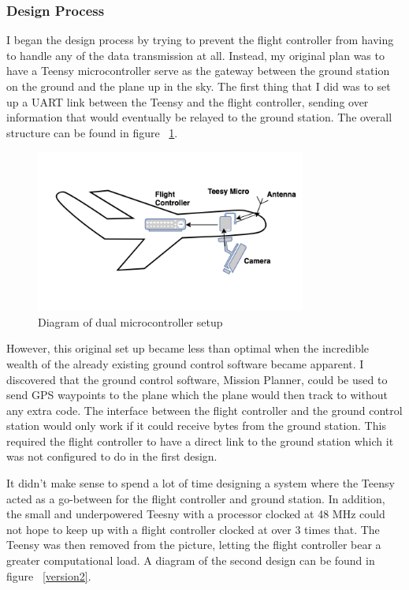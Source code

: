 \documentclass[12pt,journal,compsoc]{IEEEtran}
\begin{document}
\subsubsection{Design Process}
I began the design process by trying to prevent the flight controller from having to handle any of the data transmission at all. Instead, my original plan was to have a Teensy microcontroller serve as the gateway between the ground station on the ground and the plane up in the sky. The first thing that I did was to set up a UART link between the Teensy and the flight controller, sending over information that would eventually be relayed to the ground station. The overall structure can be found in figure ~\ref{version1}.
\begin{figure}[h!]
\hspace*{0cm}
\centering
\includegraphics[width=3.5in]{Version1.png}
\caption{Diagram of dual microcontroller setup}
\label{version1}
\end{figure}

However, this original set up became less than optimal when the incredible wealth of the already existing ground control software became apparent. I discovered that the ground control software, Mission Planner, could be used to send GPS waypoints to the plane which the plane would then track to without any extra code. The interface between the flight controller and the ground control station would only work if it could receive bytes from the ground station. This required the flight controller to have a direct link to the ground station which it was not configured to do in the first design. 

It didn't make sense to spend a lot of time designing a system where the Teensy acted as a go-between for the flight controller and ground station. In addition, the small and underpowered Teesny with a processor clocked at 48 MHz could not hope to keep up with a flight controller clocked at over 3 times that. The Teensy was then removed from the picture, letting the flight controller bear a greater computational load. A diagram of the second design can be found in figure ~\ref{version2}.
\end{document}
